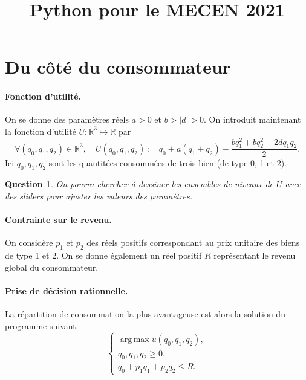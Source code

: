 \documentclass[11pt]{article}
\title{Python pour le MECEN 2021}
\author{}
\DeclareMathOperator*{\argmax}{arg\,max}
\newtheorem{question}{Question}
\begin{document}
\maketitle

\section{Du côté du consommateur}%
\label{sec:du_cote_du_consommateur}

\paragraph{Fonction d'utilité.} On se donne des paramètres réels $a>0$ et $b > |d| > 0$.
On introduit maintenant la fonction d'utilité $U: \mathbb{R}^3 \mapsto \mathbb{R}$ par
\begin{equation} \label{eq:1}
    \forall (q_0, q_1, q_2) \in \mathbb{R}^3,\quad U(q_0, q_1, q_2):= q_0 + a (q_1 + q_2) - \frac{bq_1^2+bq_2^2+2dq_1q_2}{2}.
\end{equation}
Ici $q_0, q_1, q_2$ sont les quantitées consommées de trois bien (de type 0, 1 et 2).

\begin{question}
    On pourra chercher à dessiner les ensembles de niveaux de $U$ avec des sliders pour ajuster les valeurs des paramètres.
\end{question}

\paragraph{Contrainte sur le revenu.} On considère $p_1$  et $p_2$  des réels positifs correspondant au prix unitaire des biens de type 1 et 2.
On se donne également un réel positif $R$ représentant le revenu global du consommateur.

\paragraph{Prise de décision rationnelle.} La répartition de consommation la plus avantageuse est alors la solution du programme suivant.
\begin{equation} \label{eq:2}
    \begin{cases}
        \argmax u(q_0, q_1, q_2),\\
        q_0, q_1, q_2 \geq 0,\\
        q_0 + p_1 q_1 + p_2q_2 \leq R.
    \end{cases}
\end{equation}
\end{document}
